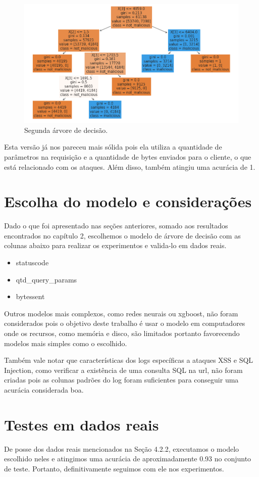 \begin{figure}
    \centering
    \includegraphics[width=.9\textwidth]{figuras/segunda_arvore.png}
    \caption{Segunda árvore de decisão. \label{fig:segunda_arvore}}    
\end{figure}

Esta versão já nos pareceu mais sólida pois ela utiliza a quantidade de parâmetros na requisição 
e a quantidade de bytes enviados para o cliente, o que está relacionado com os ataques. Além disso,
também atingiu uma acurácia de 1.

\section{Escolha do modelo e considerações}

Dado o que foi apresentado nas seções anteriores, somado aos resultados encontrados no capítulo 2, escolhemos o modelo de árvore de decisão com as colunas
abaixo para realizar os experimentos e valida-lo em dados reais. 

\begin{itemize}
    \item statuscode
    \item qtd\_query\_params
    \item bytessent
\end{itemize}

Outros modelos mais complexos, como redes neurais ou xgboost, não foram considerados pois o 
objetivo deste trabalho é usar o modelo em computadores onde os recursos, como memória e 
disco, são limitados portanto favorecendo modelos mais simples como o escolhido.

Também vale notar que características dos logs específicas a ataques XSS e SQL Injection, como 
verificar a existência de uma consulta SQL na url, não foram criadas pois as colunas padrões 
do log foram suficientes para conseguir uma acurácia considerada boa.

\section{Testes em dados reais}

De posse dos dados reais mencionados na Seção 4.2.2, executamos o modelo escolhido neles e atingimos 
uma acurácia de aproximadamente 0.93 no conjunto de teste. Portanto, definitivamente
seguimos com ele nos experimentos.
